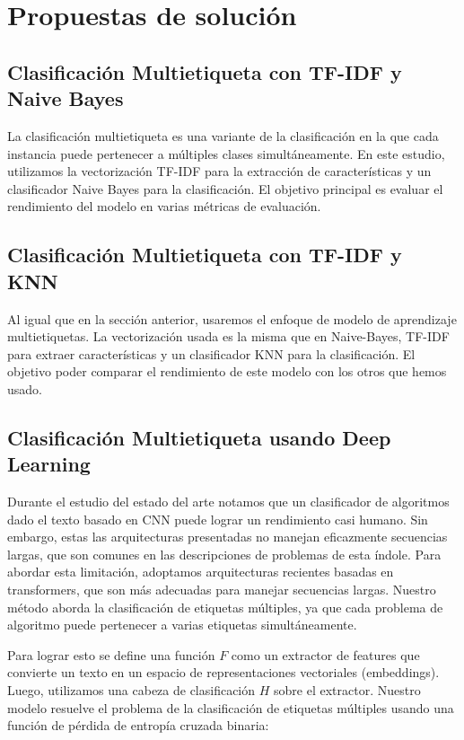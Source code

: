 \documentclass{article}
\begin{document}
\section{Propuestas de solución}
\subsection{Clasificación Multietiqueta con TF-IDF y Naive Bayes}
La clasificación multietiqueta es una variante de la clasificación en la que cada instancia puede pertenecer a múltiples clases simultáneamente. En este estudio, utilizamos la vectorización TF-IDF para la extracción de características y un clasificador Naive Bayes para la clasificación. El objetivo principal es evaluar el rendimiento del modelo en varias métricas de evaluación.
\subsection{Clasificación Multietiqueta con TF-IDF y KNN}
Al igual que en la sección anterior, usaremos el enfoque de modelo de aprendizaje multietiquetas. La vectorización usada es la misma que en Naive-Bayes, TF-IDF para extraer características y un clasificador KNN para la clasificación. El objetivo poder comparar el rendimiento de este modelo con los otros que hemos usado.

\subsection{Clasificación Multietiqueta usando Deep Learning}

Durante el estudio del estado del arte notamos que un clasificador de algoritmos dado el texto 
basado en CNN puede lograr un rendimiento casi humano. Sin embargo, estas las arquitecturas 
presentadas no manejan eficazmente secuencias largas, que son comunes en las descripciones de 
problemas de esta índole. Para abordar esta limitación, adoptamos arquitecturas recientes 
basadas en transformers, que son más adecuadas para manejar secuencias largas. Nuestro método 
aborda la clasificación de etiquetas múltiples, ya que cada problema de algoritmo puede 
pertenecer a varias etiquetas simultáneamente.

Para lograr esto se define una función $F$ como un extractor de features que convierte un 
texto en un espacio de representaciones vectoriales (embeddings). Luego, utilizamos una cabeza 
de clasificación $H$ sobre el extractor. Nuestro modelo resuelve el problema de la 
clasificación de etiquetas múltiples usando una función de pérdida de entropía cruzada binaria:
\end{document}
